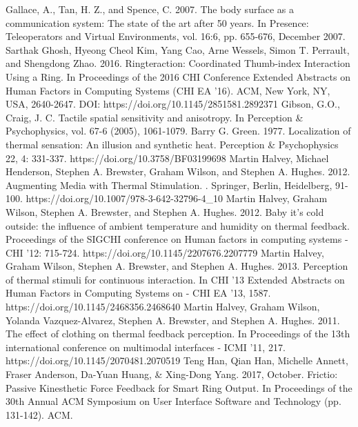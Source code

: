 \documentclass[preprint,12pt]{elsarticle}
\begin{document}
\begin{thebibliography}{00}
Gallace, A., Tan, H. Z., and Spence, C. 2007. The body surface as a communication system: The state of the art after 50 years. In Presence: Teleoperators and Virtual Environments, vol. 16:6, pp. 655-676, December 2007.
Sarthak Ghosh, Hyeong Cheol Kim, Yang Cao, Arne Wessels, Simon T. Perrault, and Shengdong Zhao. 2016. Ringteraction: Coordinated Thumb-index Interaction Using a Ring. In Proceedings of the 2016 CHI Conference Extended Abstracts on Human Factors in Computing Systems (CHI EA '16). ACM, New York, NY, USA, 2640-2647. DOI: https://doi.org/10.1145/2851581.2892371
Gibson, G.O., Craig, J. C. Tactile spatial sensitivity and anisotropy. In Perception \& Psychophysics, vol. 67-6 (2005), 1061-1079.
Barry G. Green. 1977. Localization of thermal sensation: An illusion and synthetic heat. Perception \& Psychophysics 22, 4: 331-337. https://doi.org/10.3758/BF03199698
Martin Halvey, Michael Henderson, Stephen A. Brewster, Graham Wilson, and Stephen A. Hughes. 2012. Augmenting Media with Thermal Stimulation. . Springer, Berlin, Heidelberg, 91-100. https://doi.org/10.1007/978-3-642-32796-4\_10
Martin Halvey, Graham Wilson, Stephen A. Brewster, and Stephen A. Hughes. 2012. Baby it's cold outside: the influence of ambient temperature and humidity on thermal feedback. Proceedings of the SIGCHI conference on Human factors in computing systems - CHI '12: 715-724. https://doi.org/10.1145/2207676.2207779
Martin Halvey, Graham Wilson, Stephen A. Brewster, and Stephen A. Hughes. 2013. Perception of thermal stimuli for continuous interaction. In CHI '13 Extended Abstracts on Human Factors in Computing Systems on - CHI EA '13, 1587. https://doi.org/10.1145/2468356.2468640
Martin Halvey, Graham Wilson, Yolanda Vazquez-Alvarez, Stephen A. Brewster, and Stephen A. Hughes. 2011. The effect of clothing on thermal feedback perception. In Proceedings of the 13th international conference on multimodal interfaces - ICMI '11, 217. https://doi.org/10.1145/2070481.2070519
Teng Han, Qian Han, Michelle Annett, Fraser Anderson, Da-Yuan Huang, \& Xing-Dong Yang. 2017, October. Frictio: Passive Kinesthetic Force Feedback for Smart Ring Output. In Proceedings of the 30th Annual ACM Symposium on User Interface Software and Technology (pp. 131-142). ACM.

\end{thebibliography}
\end{document}
